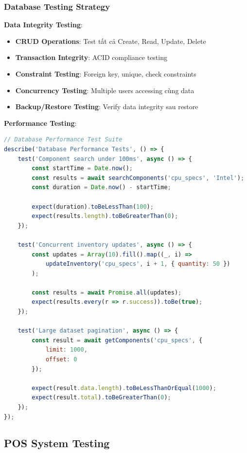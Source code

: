 \documentclass[12pt,a4paper]{article}
\begin{document}
\subsubsection{Database Testing Strategy}
\textbf{Data Integrity Testing}:
\begin{itemize}
    \item \textbf{CRUD Operations}: Test tất cả Create, Read, Update, Delete
    \item \textbf{Transaction Integrity}: ACID compliance testing
    \item \textbf{Constraint Testing}: Foreign key, unique, check constraints
    \item \textbf{Concurrency Testing}: Multiple users accessing cùng data
    \item \textbf{Backup/Restore Testing}: Verify data integrity sau restore
\end{itemize}

\textbf{Performance Testing}:
\begin{lstlisting}[language=javascript, caption=Database Performance Test Example]
// Database Performance Test Suite
describe('Database Performance Tests', () => {
    test('Component search under 100ms', async () => {
        const startTime = Date.now();
        const results = await searchComponents('cpu_specs', 'Intel');
        const duration = Date.now() - startTime;
        
        expect(duration).toBeLessThan(100);
        expect(results.length).toBeGreaterThan(0);
    });
    
    test('Concurrent inventory updates', async () => {
        const updates = Array(10).fill().map((_, i) => 
            updateInventory('cpu_specs', i + 1, { quantity: 50 })
        );
        
        const results = await Promise.all(updates);
        expect(results.every(r => r.success)).toBe(true);
    });
    
    test('Large dataset pagination', async () => {
        const result = await getComponents('cpu_specs', {
            limit: 1000,
            offset: 0
        });
        
        expect(result.data.length).toBeLessThanOrEqual(1000);
        expect(result.total).toBeGreaterThan(0);
    });
});
\end{lstlisting}

\subsection{POS System Testing}
\end{document}
